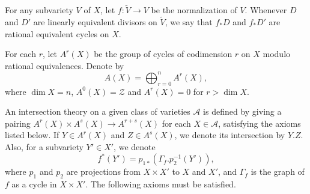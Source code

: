\documentclass[
	oldfontcommands,
	sumario=abnt-6027-2012,
	12pt,			%
	openright,		%
	oneside,		%
	a4paper,		%
	english,		%
	brazil			%
	]{imecc-unicamp}
\begin{document}
For any subvariety $V$ of $X$, let $f:\tilde V\rightarrow V$ be the normalization of $V$. Whenever $D$ and $D'$ are linearly equivalent divisors on $\tilde V$, we say that $f_*D$ and $f_*D'$ are rational equivalent cycles on $X$. 

For each $r$, let $A^r(X)$ be the group of cycles of codimension $r$ on $X$ modulo rational equivalences. Denote by $$A(X)=\bigoplus_{r=0}^n A^r(X),$$ where $\dim X=n$, $A^0(X)=\mathcal Z$ and $A^r(X)=0$ for $r>\dim X$.

An intersection theory on a given class of varieties $\mathcal A$ is defined by giving a pairing $A^r(X)\times A^s(X)\rightarrow A^{r+s}(X)$ for each $X\in \mathcal A$, satisfying the axioms listed below. If $Y\in A^r(X)$ and $Z\in A^s(X)$, we denote its intersection by $Y. Z$. Also, for a subvariety $Y'\in X'$, we denote $$f^*(Y')=p_{1*}(\Gamma_f.p_2^{-1}(Y')),$$ where $p_1$ and $p_2$ are projections from $X\times X'$ to $X$ and $X'$, and $\Gamma_f$ is the graph of $f$ as a cycle in $X\times X'$. The following axioms must be satisfied.
\end{document}
